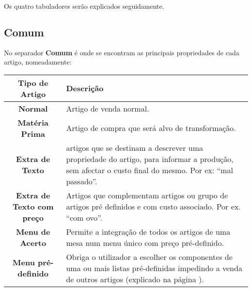 \documentclass[a4paper,11pt,openany]{memoir}
\begin{document}
Os quatro tabuladores serão explicados seguidamente.

\newpage
\subsection{Comum}

No separador \textbf{Comum} é onde se encontram as principais propriedades de cada artigo, nomeadamente:

\begin{table}[ht]
 \centering
\small
\def\arraystretch{1.5}
 \begin{tabular}{c p{11cm}}  %
 \textbf{Tipo de Artigo} & \textbf{Descrição}  \\ %
 \hline
 \textbf{Normal} & Artigo de venda normal. \\
 \textbf{Matéria Prima} & Artigo de compra que será alvo de transformação. \\
 \textbf{Extra de Texto} & artigos que se destinam a descrever uma propriedade do artigo, para informar a produção, sem afectar o custo final do mesmo. Por ex: “mal passado”. \\
 \textbf{Extra de Texto com preço} & Artigos que complementam artigos ou grupo de artigos pré definidos e com custo associado. Por ex. “com ovo”. \\
\textbf{Menu de Acerto} & Permite a integração de todos os artigos de uma mesa num menu único com preço pré-definido. \\ 
 \textbf{Menu pré-definido} & Obriga o utilizador a escolher os componentes de uma ou mais listas pré-definidas impedindo a venda de outros artigos (explicado na página \pageref{sec:menupredefinido}). \\
 \hline
 \end{tabular}
 \end{table}
\end{document}
